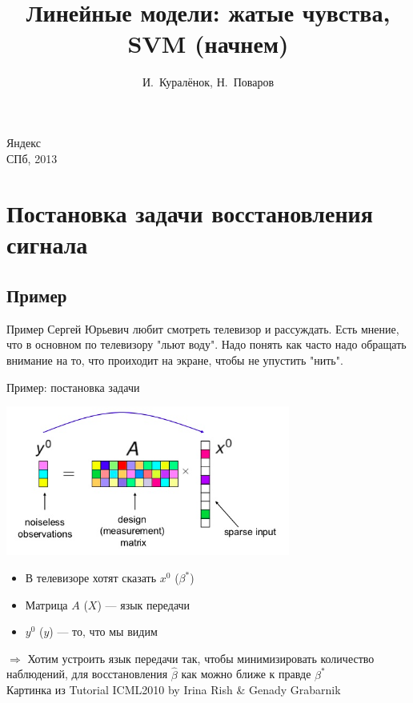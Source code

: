 \documentclass[14pt, fleqn, xcolor={dvipsnames, table}]{beamer}
\title{Линейные модели: жатые чувства, SVM (начнем)\\\small{}}
\author[]{\small{%
И.~Куралёнок,
Н.~Поваров}}
\date{}
\begin{document}
\begin{frame}

\maketitle
\small
\begin{center}
\vspace{-60pt}
\normalsize {\color{red}Я}ндекс \\
\vspace{80pt}
\footnotesize СПб, 2013
\end{center}
\end{frame}

\section{Постановка задачи восстановления сигнала}
\subsection{Пример}
\begin{frame}{Пример}
Сергей Юрьевич любит смотреть телевизор и рассуждать. Есть мнение, что в основном по телевизору "льют воду".
Надо понять как часто надо обращать внимание на то, что проиходит на экране, чтобы не упустить "нить".
\end{frame}
\begin{frame}{Пример: постановка задачи}
\begin{center}
\includegraphics[width=0.7\textwidth]{CS-ProblemSetup-1.png}
\end{center}
\vspace{-2em}
\begin{itemize}
  \item В телевизоре хотят сказать $x^0$ ($\beta^*$)
  \item Матрица $A$ ($X$) --- язык передачи
  \item $y^0$ ($y$) --- то, что мы видим
\end{itemize}
\footnotesize
$\Rightarrow$ Хотим устроить язык передачи так, чтобы минимизировать количество наблюдений, для восстановления $\hat{\beta}$ как можно ближе к правде $\beta^*$\\
\tiny Картинка из Tutorial ICML2010 by Irina Rish \& Genady Grabarnik
\end{frame}
\end{document}
